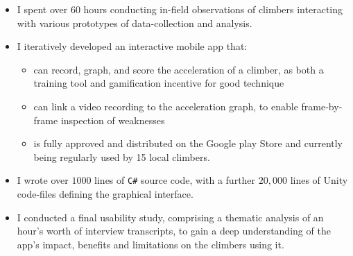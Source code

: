 \noindent
\begin{itemize}
\item I spent over $60$ hours conducting in-field observations of climbers interacting with various prototypes of data-collection and analysis.
\item I iteratively developed an interactive mobile app that: \begin{itemize}
      \item can record, graph, and score the acceleration of a climber, as both a training tool and gamification incentive for good technique
      \item can link a video recording to the acceleration graph, to enable frame-by-frame inspection of weaknesses
      \item is fully approved and distributed on the Google play Store and currently being regularly used by 15 local climbers.
\end{itemize}
\item I wrote over $1000$ lines of \verb|C#| source code, with a further $20,000$ lines of Unity code-files defining the graphical interface.
\item I conducted a final usability study, comprising a thematic analysis of an hour's worth of interview transcripts, to gain a deep understanding of the app's impact, benefits and limitations on the climbers using it. 
\end{itemize}